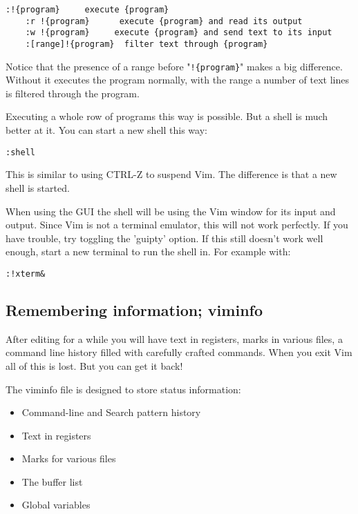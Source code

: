 \begin{Verbatim}[samepage=true]
    :!{program}     execute {program}
    :r !{program}      execute {program} and read its output
    :w !{program}     execute {program} and send text to its input
    :[range]!{program}  filter text through {program}
\end{Verbatim}

Notice that the presence of a range before "\verb:!{program}:" makes a big difference.
Without it executes the program normally, with the range a number of text lines is filtered through the program.

Executing a whole row of programs this way is possible.
But a shell is much better at it.
You can start a new shell this way:

\begin{Verbatim}[samepage=true]
 :shell
\end{Verbatim}

This is similar to using CTRL-Z to suspend Vim.
The difference is that a new shell is started.

When using the GUI the shell will be using the Vim window for its input and output.
Since Vim is not a terminal emulator, this will not work perfectly.
If you have trouble, try toggling the 'guipty' option.
If this still doesn't work well enough, start a new terminal to run the shell in.
For example with:

\begin{Verbatim}[samepage=true]
 :!xterm&
\end{Verbatim}
\subsection{Remembering information; viminfo}
After editing for a while you will have text in registers, marks in various files, a command line history filled with carefully crafted commands.
When you exit Vim all of this is lost.
But you can get it back!

The viminfo file is designed to store status information:
\begin{itemize}
\item Command-line and Search pattern history
\item Text in registers
\item Marks for various files
\item The buffer list
\item Global variables
\end{itemize}

